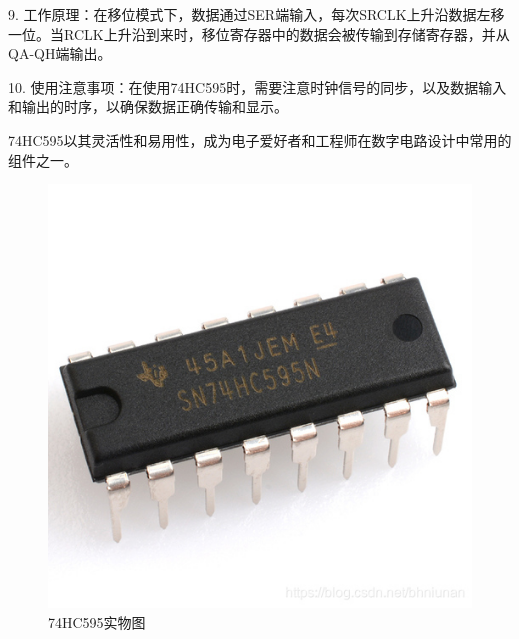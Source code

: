 \documentclass{textreportclass}  %
\begin{document}
		9. 工作原理：在移位模式下，数据通过SER端输入，每次SRCLK上升沿数据左移一位。当RCLK上升沿到来时，移位寄存器中的数据会被传输到存储寄存器，并从QA-QH端输出。
		
		10. 使用注意事项：在使用74HC595时，需要注意时钟信号的同步，以及数据输入和输出的时序，以确保数据正确传输和显示。
		
		74HC595以其灵活性和易用性，成为电子爱好者和工程师在数字电路设计中常用的组件之一。

		
		\begin{figure}[htbp]
			\centering
			\includegraphics[scale=0.2]{Fig/74HC595(2).jpg}
			\caption{74HC595实物图}\label{Fig.9}
		\end{figure}
		
\end{document}
